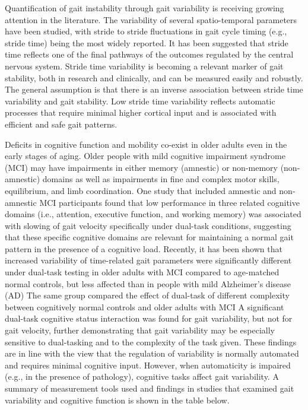 \documentclass[11pt, oneside]{report}   	%
\begin{document}
Quantification of gait instability through gait variability is receiving growing attention in the literature. The variability of several spatio-temporal parameters have been studied, with stride to stride fluctuations in gait cycle timing (e.g., stride time) being the most widely reported\cite{Montero-Odasso2013}. It has been suggested that stride time reflects one of the final pathways of the outcomes regulated by the central nervous system\cite{Montero-Odasso2013}. Stride time variability is becoming a relevant marker of gait stability, both in research and clinically, and can be measured easily and robustly\cite{Hausdorff2005}. The general assumption is that there is an inverse association between stride time variability and gait stability\cite{Montero-Odasso2013}. Low stride time variability reflects automatic processes that require minimal higher cortical input and is associated with efficient and safe gait patterns\cite{Hausdorff2005}.

Deficits in cognitive function and mobility co-exist in older adults even in the early stages of aging\cite{Montero-Odasso2013}. Older people with mild cognitive impairment syndrome (MCI) may have impairments in either memory (amnestic) or non-memory (non-amnestic) domains\cite{Yamada2011} as well as impairments in fine and complex motor skills, equilibrium, and limb coordination\cite{Montero-Odasso2013}. One study that included amnestic and non-amnestic MCI participants found that low performance in three related cognitive domains (i.e., attention, executive function, and working memory) was associated with slowing of gait velocity specifically under dual-task conditions, suggesting that these specific cognitive domains are relevant for maintaining a normal gait pattern in the presence of a cognitive load\cite{Montero-Odasso2009}. Recently, it has been shown that increased variability of time-related gait parameters were significantly different under dual-task testing in older adults with MCI compared to age-matched normal controls, but less affected than in people with mild Alzheimer's disease (AD) \cite{Muir2012a} The same group compared the effect of dual-task of different complexity between cognitively normal controls and older adults with MCI\cite{Montero-Odasso2012} A significant dual-task cognitive status interaction was found for gait variability, but not for gait velocity, further demonstrating that gait variability may be especially sensitive to dual-tasking and to the complexity of the task given\cite{Montero-Odasso2013}. These findings are in line with the view that the regulation of variability is normally automated and requires minimal cognitive input. However, when automaticity is impaired (e.g., in the presence of pathology), cognitive tasks affect gait variability. A summary of measurement tools used and findings in studies that examined gait variability and cognitive function is shown in the table below.
\end{document}
